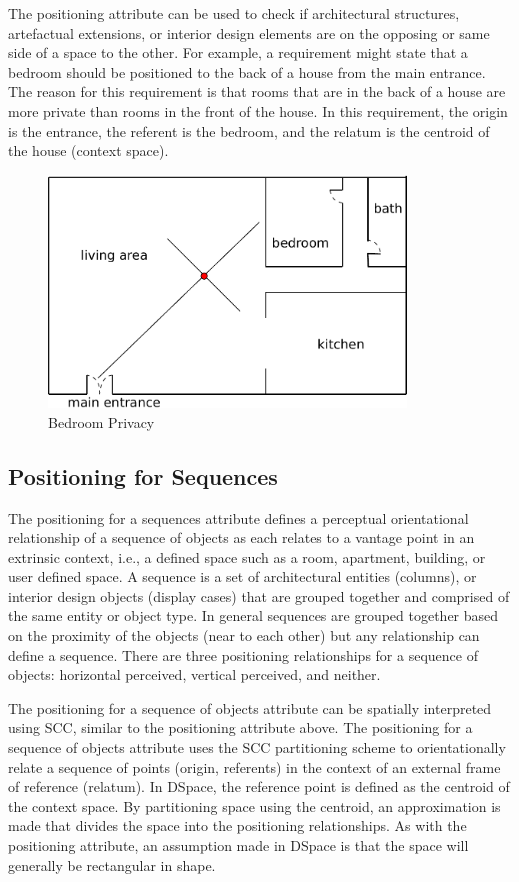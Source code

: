 \documentclass[12pt]{ucthesis}
\begin{document}
The positioning attribute can be used to check if architectural structures, artefactual extensions, or interior design elements are on the opposing or same side of a space to the other. For example, a requirement might state that a bedroom should be positioned to the back of a house from the main entrance. The reason for this requirement is that rooms that are in the back of a house are more private than rooms in the front of the house. In this requirement, the origin is the entrance, the referent is the bedroom, and the relatum is the centroid of the house (context space). 
\begin{figure}[H]
 \centering
 \includegraphics[width=95mm]{bedroom-back-house}
 \caption{Bedroom Privacy}
\label{privacy}
\end{figure}



\subsection{Positioning for Sequences}
The positioning for a sequences attribute defines a perceptual orientational relationship of a sequence of objects as each relates to a vantage point in an extrinsic context, i.e., a defined space such as a room, apartment, building, or user defined space. A sequence is a set of architectural entities (columns), or interior design objects (display cases) that are grouped together and comprised of the same entity or object type. In general sequences are grouped together based on the proximity of the objects (near to each other) but any relationship can define a sequence. There are three positioning relationships for a sequence of objects: horizontal perceived, vertical perceived, and neither.  

The positioning for a sequence of objects attribute can be spatially interpreted using SCC, similar to the positioning attribute above. The positioning for a sequence of objects attribute uses the SCC partitioning scheme to orientationally relate a sequence of points (origin, referents) in the context of an external frame of reference (relatum). In DSpace, the reference point is defined as the centroid of the context space. By partitioning space using the centroid, an approximation is made that divides the space into the positioning relationships. As with the positioning attribute, an assumption made in DSpace is that the space will generally be rectangular in shape.
\end{document}
